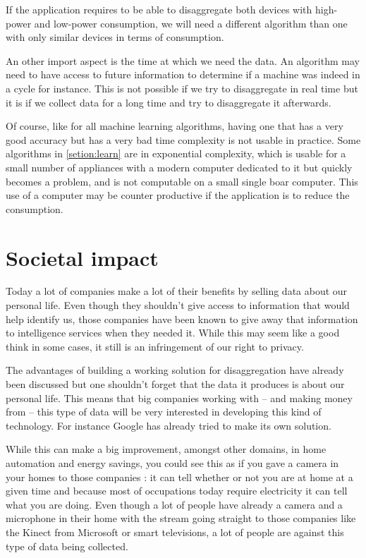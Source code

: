 If the application requires to be able to disaggregate both devices with high-power and low-power consumption, we will need a different algorithm than one with only similar devices in terms of consumption.

An other import aspect is the time at which we need the data. An algorithm may need to have access to future information to determine if a machine was indeed in a cycle for instance. This is not possible if we try to disaggregate in real time but it is if we collect data for a long time and try to disaggregate it afterwards.

Of course, like for all machine learning algorithms, having one that has a very good accuracy but has a very bad time complexity is not usable in practice. Some algorithms in \autoref{setion:learn} are in exponential complexity, which is usable for a small number of appliances with a modern computer dedicated to it but quickly becomes a problem, and is not computable on a small single boar computer. This use of a computer may be counter productive if the application is to reduce the consumption.


\section{Societal impact}
Today a lot of companies make a lot of their benefits by selling data about our personal life. Even though they shouldn't give access to information that would help identify us, those companies have been known to give away that information to intelligence services when they needed it. While this may seem like a good think in some cases, it still is an infringement of our right to privacy.

The advantages of building a working solution for disaggregation have already been discussed but one shouldn't forget that the data it produces is about our personal life. This means that big companies working with -- and making money from -- this type of data will be very interested in developing this kind of technology. For instance Google has already tried to make its own solution. \cite{googleabandon} 

While this can make a big improvement, amongst other domains, in home automation and energy savings, you could see this as if you gave a camera in your homes to those companies : it can tell whether or not you are at home at a given time and because most of occupations today require electricity it can tell what you are doing. Even though a lot of people have already a camera and a microphone in their home with the stream going straight to those companies like the Kinect from Microsoft or smart televisions, a lot of people are against this type of data being collected.

